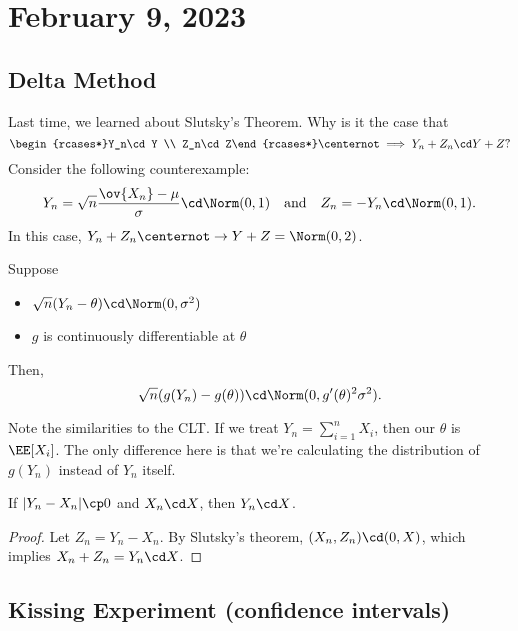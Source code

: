 \section{February 9, 2023}

\subsection{Delta Method}

Last time, we learned about Slutsky's Theorem. Why is it the case that 
\[\begin{rcases*}Y_n\cd Y \\
Z_n\cd Z\end{rcases*}\centernot\implies Y_n+Z_n\cd Y+Z?\]
Consider the following counterexample:
\[Y_n = \sqrt{n}\frac{\ov{X_n} - \mu}{\sigma}\cd \Norm(0,1) \quad\text{and}\quad Z_n=-Y_n\cd \Norm(0,1).\]
In this case, $Y_n+Z_n\centernot\rightarrow Y+Z = \Norm(0,2)$.

\begin{theorem}

Suppose
\begin{itemize}
    \item $\sqrt{n}(Y_n-\theta) \cd \Norm(0, \sigma^2)$
    \item $g$ is continuously differentiable at $\theta$
\end{itemize}
Then, 
\[\sqrt{n}(g(Y_n) - g(\theta))\cd \Norm(0, g'(\theta)^2\sigma^2).\]
\end{theorem}

Note the similarities to the CLT. If we treat $Y_n = \sum_{i=1}^n X_i$, then our $\theta$ is $\EE[X_i]$. The only difference here is that we're calculating the distribution of $g(Y_n)$ instead of $Y_n$ itself. 

\begin{theorem}
\lemlabel

If $\vert Y_n - X_n\vert \cp 0$ and $X_n\cd X$, then $Y_n\cd X$. 
\end{theorem}

\begin{proof}
Let $Z_n = Y_n-X_n$. By Slutsky's theorem, $(X_n, Z_n)\cd (0, X)$, which implies $X_n+Z_n = Y_n \cd X$.
\end{proof}

\subsection{Kissing Experiment (confidence intervals)}

